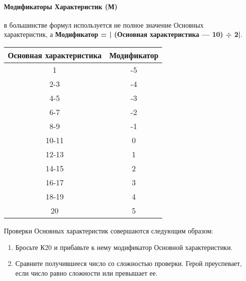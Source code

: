 \paragraph{Модификаторы Характеристик (М)} в большинстве формул используется не полное значение Основных характеристик, а \textbf{Модификатор = | (Основная характеристика — 10) ÷ 2|}.
\begin{center}
\begin{tabular}{ |c|c| }
\hline
\textbf{Основная характеристика} & \textbf{Модификатор}
\\ \hline
1 & -5
\\ \hline
2-3 & -4
\\ \hline
4-5 & -3
\\ \hline
6-7 & -2
\\ \hline
8-9 & -1
\\ \hline
10-11 & 0
\\ \hline
12-13 & 1
\\ \hline
14-15 & 2
\\ \hline
16-17 & 3
\\ \hline
18-19 & 4
\\ \hline
20 & 5
\\ \hline
\end{tabular}
\end{center}
Проверки Основных характеристик совершаются следующим образом:
\begin{enumerate}
\item Бросьте К20 и прибавьте к нему модификатор Основной характеристики.
\item Сравните получившееся число со сложностью проверки. Герой преуспевает, если число равно сложности или превышает ее.
\end{enumerate}